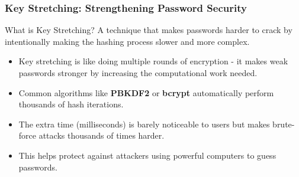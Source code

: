\documentclass{beamer}
\begin{document}
\begin{frame}
    \frametitle{Key Stretching: Strengthening Password Security}
    
    \begin{block}{What is Key Stretching?}
        A technique that makes passwords harder to crack by intentionally making the hashing process slower and more complex.
    \end{block}
    
    \begin{itemize}
        \item Key stretching is like doing multiple rounds of encryption - it makes weak passwords stronger by increasing the computational work needed.
        
        \item Common algorithms like \textbf{PBKDF2} or \textbf{bcrypt} automatically perform thousands of hash iterations.
        
        \item The extra time (milliseconds) is barely noticeable to users but makes brute-force attacks thousands of times harder.
        
        \item This helps protect against attackers using powerful computers to guess passwords.
    \end{itemize}
\end{frame}
\end{document}

